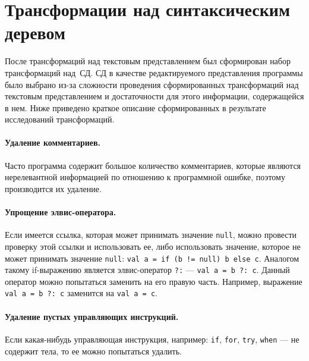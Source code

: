 \section{Трансформации над синтаксическим деревом}
После трансформаций над текстовым представлением был сформирован набор трансформаций над~СД. СД в качестве редактируемого представления программы было выбрано из-за сложности проведения сформированных трансформаций над текстовым представлением и достаточности для этого информации, содержащейся в нем. Ниже приведено краткое описание сформированных в результате исследований трансформаций.

\paragraph{Удаление комментариев.} Часто программа содержит большое количество комментариев, которые являются нерелевантной информацией по отношению к программной ошибке, поэтому производится их удаление.

\paragraph{Упрощение элвис-оператора.}
Если имеется ссылка, которая может принимать значение \texttt{null}, можно провести проверку этой ссылки и использовать ее, либо использовать значение, которое не может принимать значение \texttt{null}: \texttt{val a = if (b != null) b else c}.
Аналогом такому if-выражению является элвис-оператор \texttt{?:} --- \texttt{val a = b ?: c}.
Данный оператор можно попытаться заменить на его правую часть. Например, выражение \texttt{val a = b ?: c} заменится на \texttt{val a = c}.

\paragraph{Удаление пустых управляющих инструкций.} Если какая-нибудь управляющая инструкция, например: \texttt{if}, \texttt{for}, \texttt{try}, \texttt{when} --- не содержит тела, то ее можно попытаться удалить.

